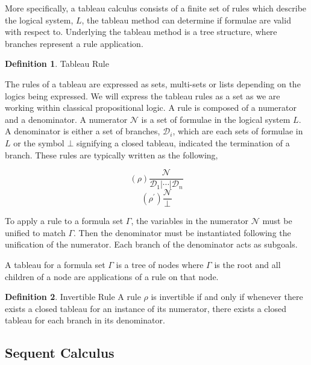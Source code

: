 \documentclass{report}
\theoremstyle{definition}
\newtheorem{definition}{Definition}[section]
\begin{document}
More specifically, a tableau calculus consists of a finite set of rules which
describe the logical system, $L$, the tableau method can determine if formulae
are valid with respect to. Underlying the tableau method is a tree structure,
where branches represent a rule application.

\begin{definition}{Tableau Rule}

The rules of a tableau are expressed as sets, multi-sets or lists depending on
the logics being expressed. We will express the tableau rules as a set as we
are working within classical propositional logic. A rule is composed of a
numerator and a denominator. A numerator $\mathcal{N}$ is a set of formulae in
the logical system $L$. A denominator is either a set of branches,
$\mathcal{D}_i$, which are each sets of formulae in $L$ or the symbol $\bot$
signifying a closed tableau, indicated the termination of a branch. These rules
are typically written as the following,

\begin{multicols}{2}
\begin{equation*}
(\rho)\frac{\mathcal{N}}{\mathcal{D}_1 \vert \cdots \vert \mathcal{D}_n}
\end{equation*}
\break
\begin{equation*}
(\rho^{\prime})\frac{\mathcal{N}}{\bot}
\end{equation*}
\end{multicols}

To apply a rule to a formula set $\Gamma$, the variables in the numerator
$\mathcal{N}$ must be unified to match $\Gamma$.  Then the denominator must be
instantiated following the unification of the numerator. Each branch of the
denominator acts as subgoals.

\end{definition}

A tableau for a formula set $\Gamma$ is a tree of nodes where $\Gamma$ is the
root and all children of a node are applications of a rule on that node.

\begin{definition}{Invertible Rule}
A rule $\rho$ is invertible if and only if whenever there exists a closed
tableau for an instance of its numerator, there exists a closed tableau for
each branch in its denominator.
\end{definition}

\subsection{Sequent Calculus}
\end{document}
